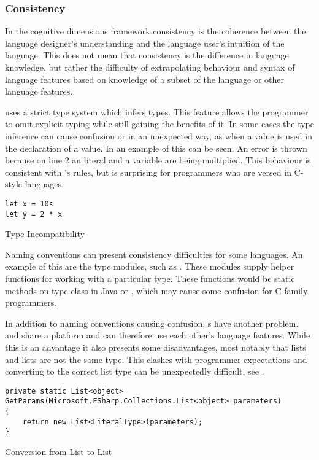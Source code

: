 \subsubsection{Consistency}
In the cognitive dimensions framework consistency is the coherence between the language designer's understanding and the language user's intuition of the language\cite{green1996usability}. This does not mean that consistency is the difference in language knowledge, but rather the difficulty of extrapolating behaviour and syntax of language features based on knowledge of a subset of the language or other language features.

\fs uses a strict type system which infers types. This feature allows the programmer to omit explicit typing while still gaining the benefits of it. In some cases the type inference can cause confusion or in an unexpected way, as when a  value is used in the declaration of a  value. In  an example of this can be seen. An error is thrown because on line 2 an  literal and a  variable are being multiplied. This behaviour is consistent with \fs's rules, but is surprising for programmers who are versed in C-style languages.

\begin{listing}[H]
\begin{verbatim}
let x = 10s
let y = 2 * x
\end{verbatim}
\caption{Type Incompatibility}
\label{lst:type-incompat}
\end{listing}

Naming conventions can present consistency difficulties for some languages. An example of this are the type modules, such as . These modules supply helper functions for working with a particular type. These functions would be static methods on type class in Java or \cs, which may cause some confusion for C-family programmers.

In addition to naming conventions causing confusion, s have another problem. \fs and \cs share a platform and can therefore use each other's language features. While this is an advantage it also presents some disadvantages, most notably that \fs lists and \cs lists are not the same type. This clashes with programmer expectations and converting to the correct list type can be unexpectedly difficult, see .

\begin{listing}[H]
\begin{verbatim}
private static List<object> GetParams(Microsoft.FSharp.Collections.List<object> parameters)
{
    return new List<LiteralType>(parameters);
}
\end{verbatim}
\caption{Conversion from \fs List to \cs List}
\label{lst:list-conv}
\end{listing}

